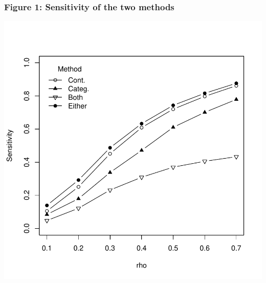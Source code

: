\documentclass{article}
\begin{document}
\subsubsection*{Figure 1: Sensitivity of the two methods}

\includegraphics{accuracy-dd}
\end{document}
